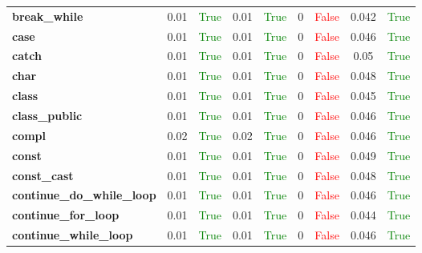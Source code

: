 \documentclass{article}
\begin{document}
\begin{xltabular}{\textwidth}{lcccccccc}
\textbf{{\fontsize{10}{12}\selectfont break\_while}}& 0.01&\textcolor{green}{True}& 0.01&\textcolor{green}{True}& 0&\textcolor{red}{False}& 0.042&\textcolor{green}{True} \\[0.5ex]
\textbf{{\fontsize{10}{12}\selectfont case}}& 0.01&\textcolor{green}{True}& 0.01&\textcolor{green}{True}& 0&\textcolor{red}{False}& 0.046&\textcolor{green}{True} \\[0.5ex]
\textbf{{\fontsize{10}{12}\selectfont catch}}& 0.01&\textcolor{green}{True}& 0.01&\textcolor{green}{True}& 0&\textcolor{red}{False}& 0.05&\textcolor{green}{True} \\[0.5ex]
\textbf{{\fontsize{10}{12}\selectfont char}}& 0.01&\textcolor{green}{True}& 0.01&\textcolor{green}{True}& 0&\textcolor{red}{False}& 0.048&\textcolor{green}{True} \\[0.5ex]
\textbf{{\fontsize{10}{12}\selectfont class}}& 0.01&\textcolor{green}{True}& 0.01&\textcolor{green}{True}& 0&\textcolor{red}{False}& 0.045&\textcolor{green}{True} \\[0.5ex]
\textbf{{\fontsize{10}{12}\selectfont class\_public}}& 0.01&\textcolor{green}{True}& 0.01&\textcolor{green}{True}& 0&\textcolor{red}{False}& 0.046&\textcolor{green}{True} \\[0.5ex]
\textbf{{\fontsize{10}{12}\selectfont compl}}& 0.02&\textcolor{green}{True}& 0.02&\textcolor{green}{True}& 0&\textcolor{red}{False}& 0.046&\textcolor{green}{True} \\[0.5ex]
\textbf{{\fontsize{10}{12}\selectfont const}}& 0.01&\textcolor{green}{True}& 0.01&\textcolor{green}{True}& 0&\textcolor{red}{False}& 0.049&\textcolor{green}{True} \\[0.5ex]
\textbf{{\fontsize{10}{12}\selectfont const\_cast}}& 0.01&\textcolor{green}{True}& 0.01&\textcolor{green}{True}& 0&\textcolor{red}{False}& 0.048&\textcolor{green}{True} \\[0.5ex]
\textbf{{\fontsize{10}{12}\selectfont continue\_do\_while\_loop}}& 0.01&\textcolor{green}{True}& 0.01&\textcolor{green}{True}& 0&\textcolor{red}{False}& 0.046&\textcolor{green}{True} \\[0.5ex]
\textbf{{\fontsize{10}{12}\selectfont continue\_for\_loop}}& 0.01&\textcolor{green}{True}& 0.01&\textcolor{green}{True}& 0&\textcolor{red}{False}& 0.044&\textcolor{green}{True} \\[0.5ex]
\textbf{{\fontsize{10}{12}\selectfont continue\_while\_loop}}& 0.01&\textcolor{green}{True}& 0.01&\textcolor{green}{True}& 0&\textcolor{red}{False}& 0.046&\textcolor{green}{True} \\[0.5ex]

\end{xltabular}
\end{document}
